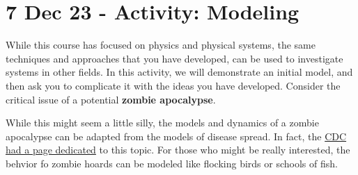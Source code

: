 \section{7 Dec 23 - Activity:
Modeling}\label{dec-23---activity-modeling}

While this course has focused on physics and physical systems, the same
techniques and approaches that you have developed, can be used to
investigate systems in other fields. In this activity, we will
demonstrate an initial model, and then ask you to complicate it with the
ideas you have developed. Consider the critical issue of a potential
\textbf{zombie apocalypse}.

While this might seem a little silly, the models and dynamics of a
zombie apocalypse can be adapted from the models of disease spread. In
fact, the
\href{https://www.usatoday.com/story/news/nation/2021/03/05/zombie-apocalypse-cdc-useful-advice-any-emergency-pandemic/6920614002/}{CDC
had a page dedicated} to this topic. For those who might be really
interested, the behvior fo zombie hoards can be modeled like flocking
birds or schools of fish.
